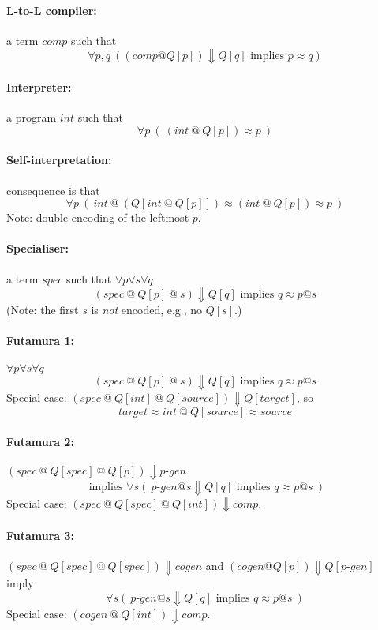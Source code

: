 \documentclass[11pt,fleqn]{article}
\newcommand{\pg}[1]{\paragraph{#1}}
\begin{document}
\pg{L-to-L compiler:} a term $comp$ such that
$$
\forall p, q\ ((comp @ Q[p]) \Downarrow Q[q] \mbox{\ implies\ } p \approx q)
$$

\pg{Interpreter:} a program $int$ such that
$$
\forall p\ (\  (int\ @\ Q[p]) \approx p\ )
$$



\pg{Self-interpretation:} consequence is that
$$
\forall p\ (\ int\ @\ (Q[ int\ @\ Q[p]]) \approx  (int\ @\ Q[p]) \approx p\ )
$$
Note: double encoding of the leftmost $p$.



\pg{Specialiser:} a term $spec$ such that $\forall p\forall s\forall q$
$$
(spec\ @\ Q[p]\ @\ s) \Downarrow Q[q] \mbox{\ implies\ } q \approx  p@s 
$$
(Note: the first $s$ is {\em not} encoded, e.g., no  $Q[s]$.)

\vspace{5mm}


\pg{Futamura 1:}  $\forall p\forall s\forall q$
$$
(spec\ @\ Q[p]\ @\ s) \Downarrow Q[q]
\mbox{\ implies\ }
 q \approx  p@s 
 $$
Special case: $(spec\ @\ Q[int]\ @\ Q[source]) \Downarrow Q[target]$, so
$$target \approx int \ @\ Q[source] \approx source
$$

\pg{Futamura 2:}  $
(spec\ @\ Q[spec]\ @\ Q[p]) \Downarrow p\mbox{-}gen$
$$
\mbox{ implies\ }
\forall s (\ 
p\mbox{-}gen@s \Downarrow Q[q]
\mbox{ implies\ }
q \approx p @ s\ )
$$
Special case: $(spec\ @\ Q[spec]\ @\ Q[int]) \Downarrow comp$.
 \vspace{5mm}

\pg{Futamura 3:}  $
(spec\ @\ Q[spec]\ @\ Q[spec]) \Downarrow cogen$
and $(cogen@Q[p]) \Downarrow Q[p\mbox{-}gen]$
imply
$$
\forall s (\ 
p\mbox{-}gen@s \Downarrow Q[q]
\mbox{ implies\ }
q \approx p @ s\ )
$$
Special case: $(cogen\ @\ Q[int]) \Downarrow comp$.

\newpage
\end{document}
